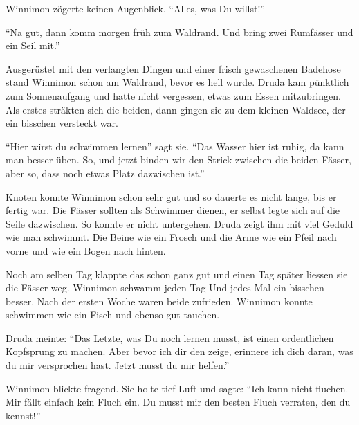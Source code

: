 Winnimon zögerte keinen Augenblick. \enquote{Alles, was Du willst!}

\enquote{Na gut, dann komm morgen früh zum Waldrand. Und bring zwei Rumfässer und ein Seil mit.}

Ausgerüstet mit den verlangten Dingen und einer frisch gewaschenen Badehose stand Winnimon schon am Waldrand, bevor es hell wurde. Druda kam pünktlich zum Sonnenaufgang und hatte nicht vergessen, etwas zum Essen mitzubringen. Als erstes sträkten sich die beiden, dann gingen sie zu dem kleinen Waldsee, der ein bisschen versteckt war.

\enquote{Hier wirst du schwimmen lernen} sagt sie. \enquote{Das Wasser hier ist ruhig, da kann man besser üben. So, und jetzt binden wir den Strick zwischen die beiden Fässer, aber so, dass noch etwas Platz dazwischen ist.}

Knoten konnte Winnimon schon sehr gut und so dauerte es nicht lange, bis er fertig war. Die Fässer sollten als Schwimmer dienen, er selbst legte sich auf die Seile dazwischen. So konnte er nicht untergehen. Druda zeigt ihm mit viel Geduld wie man schwimmt. Die Beine wie ein Frosch und die Arme wie ein Pfeil nach vorne und wie ein Bogen nach hinten.

Noch am selben Tag klappte das schon ganz gut und einen Tag später liessen sie die Fässer weg. Winnimon schwamm jeden Tag Und jedes Mal ein bisschen besser. Nach der ersten Woche waren beide zufrieden. Winnimon konnte schwimmen wie ein Fisch und ebenso gut tauchen.

Druda meinte: \enquote{Das Letzte, was Du noch lernen musst, ist einen ordentlichen Kopfsprung zu machen. Aber bevor ich dir den zeige, erinnere ich dich daran, was du mir versprochen hast. Jetzt musst du mir helfen.}

Winnimon blickte fragend. Sie holte tief Luft und sagte: \enquote{Ich kann nicht fluchen. Mir fällt einfach kein Fluch ein. Du musst mir den besten Fluch verraten, den du kennst!}





\hfill {\color{red}\decofourleft}

